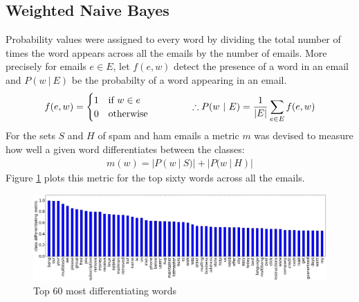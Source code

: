 \documentclass[12pt, a4paper]{article}
\begin{document}
	\begin{minipage}{\linewidth}
  \subsection{Weighted Naive Bayes}

  Probability values were assigned to every word by dividing the total number of times the word appears across all the emails by the number of emails. More precisely for emails $e \in E$, let $f(e, w)$ detect the presence of a word in an email and $P(w\ |\ E)$ be the probabilty of a word appearing in an email.
  \vspace{-0.1cm}
  \begin{align*}
    f(e, w) = \begin{cases}
      1   & \text{if } w \in e \\
      0   & \text{otherwise}
    \end{cases}
		\hspace{1.5cm}
    \therefore P(w\ |\ E) = \frac{1}{|E|}\sum_{e \in E}{f(e, w)}
  \end{align*}
  For the sets $S$ and $H$ of spam and ham emails a metric $m$ was devised to measure how well a given word differentiates between the classes:
  \vspace{-0.1cm}
  \begin{align*}
    m(w) = |P(w\ |\ S)| + |P(w\ |\ H)|
  \end{align*}
  Figure \ref{wordprobsham} plots this metric for the top sixty words across all the emails.

  \begin{figure}[H]
    \caption{Top 60 most differentiating words}
    \label{wordprobsham}
    \vspace{-0.2cm}
    \centering
    \includegraphics[width=1\linewidth]{report_images/word_probs_diff}
  \end{figure}


\end{minipage}
\end{document}
